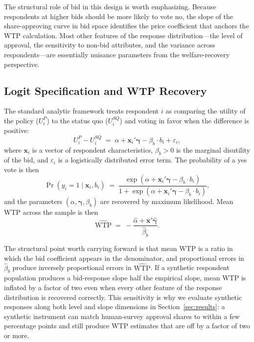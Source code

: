\documentclass[12pt]{article}
\begin{document}
The structural role of bid in this design is worth emphasizing. Because
respondents at higher bids should be more likely to vote no, the slope of
the share-approving curve in bid space identifies the price coefficient
that anchors the WTP calculation. Most other features of the response
distribution---the level of approval, the sensitivity to non-bid
attributes, and the variance across respondents---are essentially
nuisance parameters from the welfare-recovery perspective.

\subsection{Logit Specification and WTP Recovery}\label{sec:bg-logit}

The standard analytic framework treats respondent $i$ as comparing the
utility of the policy ($U_i^P$) to the status quo ($U_i^{SQ}$) and voting
in favor when the difference is positive:
\begin{equation}
    U_i^P - U_i^{SQ} \;=\; \alpha + \mathbf{x}_i'\boldsymbol{\gamma}
    - \beta_b \cdot b_i + \varepsilon_i,
    \label{eq:bg-utility}
\end{equation}
where $\mathbf{x}_i$ is a vector of respondent characteristics, $\beta_b > 0$
is the marginal disutility of the bid, and $\varepsilon_i$ is a
logistically distributed error term. The probability of a yes vote is then
\begin{equation}
    \Pr(y_i = 1 \mid \mathbf{x}_i, b_i) \;=\;
    \frac{\exp(\alpha + \mathbf{x}_i'\boldsymbol{\gamma} - \beta_b \cdot b_i)}{1 + \exp(\alpha + \mathbf{x}_i'\boldsymbol{\gamma} - \beta_b \cdot b_i)},
    \label{eq:bg-logit}
\end{equation}
and the parameters $(\alpha, \boldsymbol{\gamma}, \beta_b)$ are recovered by
maximum likelihood. Mean WTP across the sample is then
\begin{equation}
    \widehat{\text{WTP}} \;=\;
    -\frac{\hat{\alpha} + \overline{\mathbf{x}}'\hat{\boldsymbol{\gamma}}}{\hat{\beta}_b}.
    \label{eq:bg-wtp}
\end{equation}

The structural point worth carrying forward is that mean WTP is a ratio in
which the bid coefficient appears in the denominator, and proportional
errors in $\hat{\beta}_b$ produce inversely proportional errors in
$\widehat{\text{WTP}}$. If a synthetic respondent population produces a
bid-response slope half the empirical slope, mean WTP is inflated by a
factor of two even when every other feature of the response distribution
is recovered correctly. This sensitivity is why we evaluate synthetic
responses along both level and slope dimensions in Section~\ref{sec:results}:
a synthetic instrument can match human-survey approval shares to within
a few percentage points and still produce WTP estimates that are off by
a factor of two or more.
\end{document}
